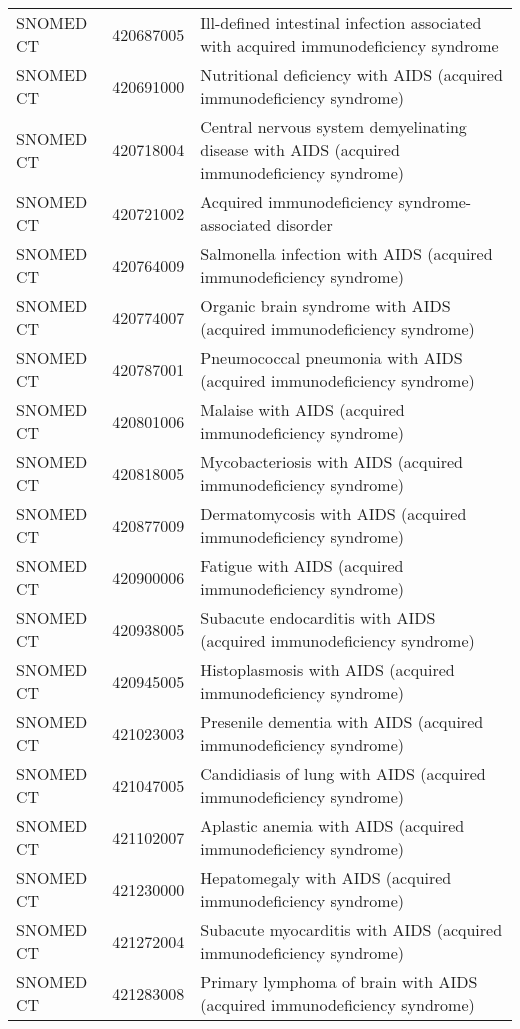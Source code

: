 \begin{table}[ht]
\begin{tabular}{lll}
  SNOMED CT & 420687005 & Ill-defined intestinal infection associated with acquired immunodeficiency syndrome \\ 
  SNOMED CT & 420691000 & Nutritional deficiency with AIDS (acquired immunodeficiency syndrome) \\ 
  SNOMED CT & 420718004 & Central nervous system demyelinating disease with AIDS (acquired immunodeficiency syndrome) \\ 
  SNOMED CT & 420721002 & Acquired immunodeficiency syndrome-associated disorder \\ 
  SNOMED CT & 420764009 & Salmonella infection with AIDS (acquired immunodeficiency syndrome) \\ 
  SNOMED CT & 420774007 & Organic brain syndrome with AIDS (acquired immunodeficiency syndrome) \\ 
  SNOMED CT & 420787001 & Pneumococcal pneumonia with AIDS (acquired immunodeficiency syndrome) \\ 
  SNOMED CT & 420801006 & Malaise with AIDS (acquired immunodeficiency syndrome) \\ 
  SNOMED CT & 420818005 & Mycobacteriosis with AIDS (acquired immunodeficiency syndrome) \\ 
  SNOMED CT & 420877009 & Dermatomycosis with AIDS (acquired immunodeficiency syndrome) \\ 
  SNOMED CT & 420900006 & Fatigue with AIDS (acquired immunodeficiency syndrome) \\ 
  SNOMED CT & 420938005 & Subacute endocarditis with AIDS (acquired immunodeficiency syndrome) \\ 
  SNOMED CT & 420945005 & Histoplasmosis with AIDS (acquired immunodeficiency syndrome) \\ 
  SNOMED CT & 421023003 & Presenile dementia with AIDS (acquired immunodeficiency syndrome) \\ 
  SNOMED CT & 421047005 & Candidiasis of lung with AIDS (acquired immunodeficiency syndrome) \\ 
  SNOMED CT & 421102007 & Aplastic anemia with AIDS (acquired immunodeficiency syndrome) \\ 
  SNOMED CT & 421230000 & Hepatomegaly with AIDS (acquired immunodeficiency syndrome) \\ 
  SNOMED CT & 421272004 & Subacute myocarditis with AIDS (acquired immunodeficiency syndrome) \\ 
  SNOMED CT & 421283008 & Primary lymphoma of brain with AIDS (acquired immunodeficiency syndrome) \\ 

\end{tabular}
\end{table}

